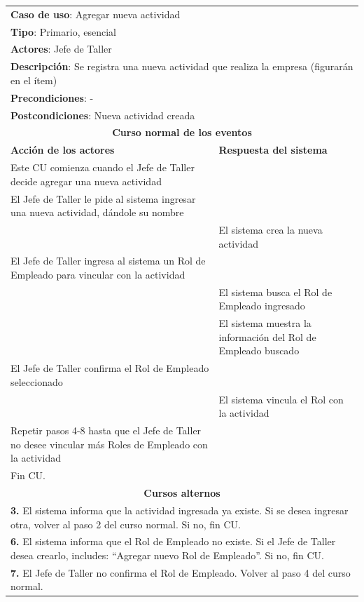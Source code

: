 \documentclass[12pt]{extarticle}
\begin{document}
\begin{spacing}{1.2}
	\begin{longtable}{ |p{8cm}|p{8cm}| }
		\hline
		\multicolumn{2}{|p{16cm}|}{\textbf{Caso de uso}: Agregar nueva actividad}\\
		\multicolumn{2}{|p{16cm}|}{\textbf{Tipo}: Primario, esencial}\\
		\multicolumn{2}{|p{16cm}|}{\textbf{Actores}: Jefe de Taller}\\
		\multicolumn{2}{|p{16cm}|}{\textbf{Descripción}: Se registra una nueva actividad que realiza la empresa (figurarán en el ítem)}\\
		\multicolumn{2}{|p{16cm}|}{\textbf{Precondiciones}: -}\\
		\multicolumn{2}{|p{16cm}|}{\textbf{Postcondiciones}: Nueva actividad creada}\\
		\hline
		\multicolumn{2}{|c|}{\textbf{Curso normal de los eventos}}\\
		\hline
		\textbf{Acción de los actores} & \textbf{Respuesta del sistema}\\
		\hline
			\inc Este CU comienza cuando el Jefe de Taller decide agregar una nueva actividad& \\
			\hline
			\inc El Jefe de Taller le pide al sistema ingresar una nueva actividad, dándole su nombre & \\
			\hline
			& \inc El sistema crea la nueva actividad \\
			\hline
			\inc El Jefe de Taller ingresa al sistema un Rol de Empleado para vincular con la actividad & \\
			\hline
			& \inc El sistema busca el Rol de Empleado ingresado \\
			\hline
			& \inc El sistema muestra la información del Rol de Empleado buscado \\
			\hline
			\inc El Jefe de Taller confirma el Rol de Empleado seleccionado & \\
			\hline
			& \inc El sistema vincula el Rol con la actividad \\
			\hline
			\inc  Repetir pasos 4-8 hasta que el Jefe de Taller no desee vincular más Roles de Empleado con la actividad& \\
			\hline
			\inc Fin CU. & \\
		\hline
		\multicolumn{2}{|c|}{\textbf{Cursos alternos}}\\
		\hline
        \multicolumn{2}{|p{16cm}|}{\textbf{3. }El sistema informa que la actividad ingresada ya existe. Si se desea ingresar otra, volver al paso 2 del curso normal. Si no, fin CU.}\\
		\hline
        \multicolumn{2}{|p{16cm}|}{\textbf{6. }El sistema informa que el Rol de Empleado no existe. Si el Jefe de Taller desea crearlo, includes: ``Agregar nuevo Rol de Empleado''. Si no, fin CU.}\\
		\hline
        \multicolumn{2}{|p{16cm}|}{\textbf{7. }El Jefe de Taller no confirma el Rol de Empleado. Volver al paso 4 del curso normal.}\\
		\hline
	\end{longtable}



\end{spacing}
\end{document}
